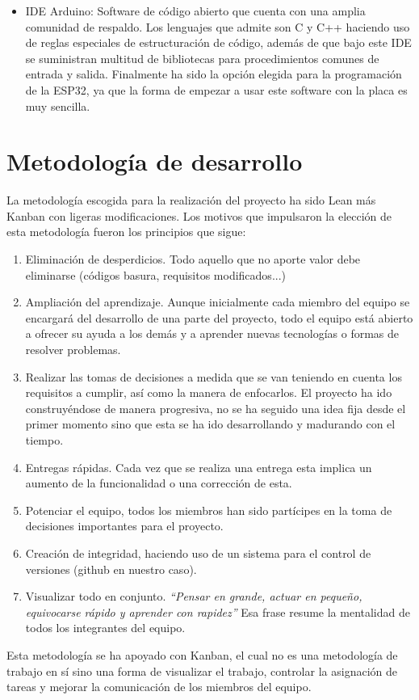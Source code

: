 \documentclass[runningheads]{llncs}
\begin{document}
\begin{itemize}
    \item IDE Arduino:  Software de código abierto que cuenta con una amplia comunidad de respaldo. Los lenguajes que admite son C y C++ haciendo uso de reglas especiales de estructuración de código, además de que bajo este IDE se suministran multitud de bibliotecas para procedimientos comunes de entrada y salida. Finalmente ha sido la opción elegida para la programación de la ESP32, ya que la forma de empezar a usar este software con la placa es muy sencilla.
    
\end{itemize}

\section{Metodología de desarrollo}
La metodología escogida para la realización del proyecto ha sido Lean más Kanban con ligeras modificaciones. Los motivos que impulsaron la elección de esta metodología fueron los principios que sigue:

\begin{enumerate}
\item Eliminación de desperdicios. Todo aquello que no aporte valor debe eliminarse (códigos basura, requisitos modificados...)
\item Ampliación del aprendizaje. Aunque inicialmente cada miembro del equipo se encargará del desarrollo de una parte del proyecto, todo el equipo está abierto a ofrecer su ayuda a los demás y a aprender nuevas tecnologías o formas de resolver problemas.
\item Realizar las tomas de decisiones a medida que se van teniendo en cuenta los requisitos a cumplir, así como la manera de enfocarlos. El proyecto ha ido construyéndose de manera progresiva, no se ha seguido una idea fija desde el primer momento sino que esta se ha ido desarrollando y madurando con el tiempo.
\item Entregas rápidas. Cada vez que se realiza una entrega esta implica un aumento de la funcionalidad o una corrección de esta.
\item Potenciar el equipo, todos los miembros han sido partícipes en la toma de decisiones importantes para el proyecto.
\item Creación de integridad, haciendo uso de un sistema para el control de versiones (github en nuestro caso).
\item Visualizar todo en conjunto. \textit{“Pensar en grande, actuar en pequeño, equivocarse rápido y aprender con rapidez”} Esa frase resume la mentalidad de todos los integrantes del equipo. \newline
\end{enumerate}
Esta metodología se ha apoyado con Kanban, el cual no es una metodología de trabajo en sí sino una forma de visualizar el trabajo, controlar la asignación de tareas y mejorar la comunicación de los miembros del equipo.
\end{document}
